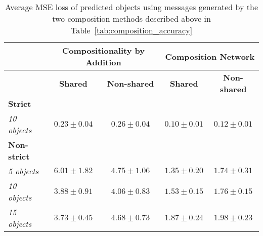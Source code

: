 \documentclass[11pt,a4paper]{article}
\begin{document}
\begin{table*}[h!]
\begin{tabular}{lcccc}
\toprule
                       & \multicolumn{2}{c}{\textbf{Compositionality by Addition}} & \multicolumn{2}{c}{\textbf{Composition Network}} \\ \midrule
                       & \textbf{Shared} & \textbf{Non-shared} & \textbf{Shared} & \textbf{Non-shared} \\ \midrule
\textbf{Strict} & \\ 
\emph{10 objects} &  $0.23\pm 0.04$  & $0.26\pm 0.04$ &  $0.10\pm 0.01$  & $0.12\pm 0.01$      \\ %
\textbf{Non-strict} & \\
\emph{5 objects} &
	$6.01\pm 1.82$  & $4.75\pm 1.06$ &  $1.35\pm 0.20$  & $1.74\pm 0.31$      \\
\emph{10 objects} &
	$3.88\pm 0.91$  & $4.06\pm 0.83$ &  $1.53\pm 0.15$  & $1.76\pm 0.15$     \\
\emph{15 objects} &
	$3.73\pm 0.45$  & $4.68\pm 0.73$ &  $1.87\pm 0.24$  & $1.98\pm 0.23$     \\ \bottomrule
\end{tabular}
\caption{Average MSE loss of predicted objects using messages generated by the two composition methods described above in Table~\ref{tab:composition_accuracy}}\label{tab:composition_mse_losses}
\end{table*}
\end{document}
